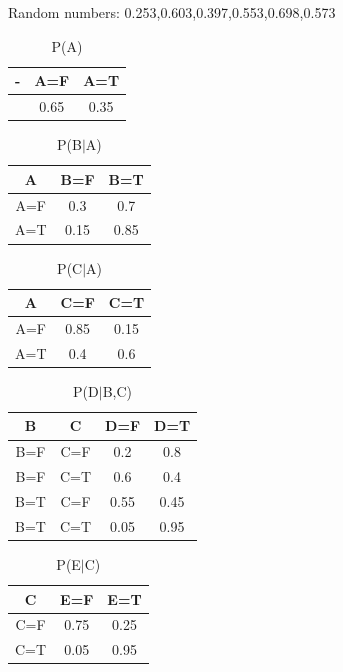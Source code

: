 \documentclass{article}
\begin{document}
Random numbers: 0.253,0.603,0.397,0.553,0.698,0.573 
\begin{table}[h!]
\caption{P(A)}
\label{MCMC1}
\begin{center}
\begin{tabular}{ |c||c|c| } 
\hline
 - & A=F & A=T\\
\hline
 & 0.65 & 0.35\\
\hline
\end{tabular}
\end{center}
\end{table}
\begin{table}[h!]
\caption{P(B$|$A)}
\label{MCMC2}
\begin{center}
\begin{tabular}{ |c||c|c| } 
\hline
 A & B=F & B=T\\
\hline
 A=F & 0.3 & 0.7\\
 A=T & 0.15 & 0.85\\
\hline
\end{tabular}
\end{center}
\end{table}
\begin{table}[h!]
\caption{P(C$|$A)}
\label{MCMC3}
\begin{center}
\begin{tabular}{ |c||c|c| } 
\hline
 A & C=F & C=T\\
\hline
 A=F & 0.85 & 0.15\\
 A=T & 0.4 & 0.6\\
\hline
\end{tabular}
\end{center}
\end{table}
\begin{table}[h!]
\caption{P(D$|$B,C)}
\label{MCMC4}
\begin{center}
\begin{tabular}{ |c|c||c|c| } 
\hline
 B & C & D=F & D=T\\
\hline
 B=F & C=F & 0.2 & 0.8\\
 B=F & C=T & 0.6 & 0.4\\
 B=T & C=F & 0.55 & 0.45\\
 B=T & C=T & 0.05 & 0.95\\
\hline
\end{tabular}
\end{center}
\end{table}
\begin{table}[h!]
\caption{P(E$|$C)}
\label{MCMC5}
\begin{center}
\begin{tabular}{ |c||c|c| } 
\hline
 C & E=F & E=T\\
\hline
 C=F & 0.75 & 0.25\\
 C=T & 0.05 & 0.95\\
\hline
\end{tabular}
\end{center}
\end{table}
\end{document}
